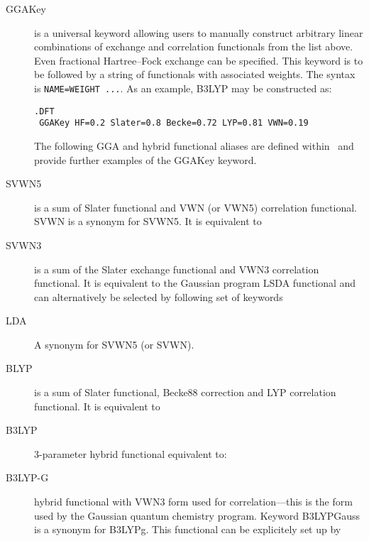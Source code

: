 \begin{description}
\begin{description}
\item[GGAKey] is a universal keyword allowing users to manually
  construct arbitrary linear combinations of exchange and correlation 
  functionals from the list above. Even fractional 
  Hartree--Fock exchange can be specified. This keyword is to be 
  followed by a string of functionals with associated weights. 
  The syntax is \verb|NAME=WEIGHT ...|. 
  As an example, B3LYP may be constructed as:
\begin{verbatim}
.DFT
 GGAKey HF=0.2 Slater=0.8 Becke=0.72 LYP=0.81 VWN=0.19
\end{verbatim}

The following GGA and hybrid functional aliases are defined within 
\lsdalton\ and provide further examples of the GGAKey keyword.

\item[SVWN5] is a sum of Slater functional and VWN (or VWN5) correlation
  functional. SVWN is a synonym for SVWN5. It is equivalent to

\item[SVWN3] is a sum of the Slater exchange functional and VWN3 correlation
  functional. It is equivalent to the Gaussian program LSDA functional 
  and can alternatively be selected by following set of keywords

\item[LDA] A synonym for SVWN5 (or SVWN). 


\item[BLYP] is a sum of Slater functional, Becke88 correction and LYP
  correlation functional.  It is equivalent to 

\item[B3LYP] 3-parameter hybrid functional \cite{dft:b3lyp} equivalent to:

\item[B3LYP-G] hybrid functional with VWN3 form used for
  correlation---this is the form used by the Gaussian quantum chemistry
  program. Keyword B3LYPGauss is a synonym for B3LYPg. 
  This functional can be explicitely set up by


\end{description}
\end{description}
